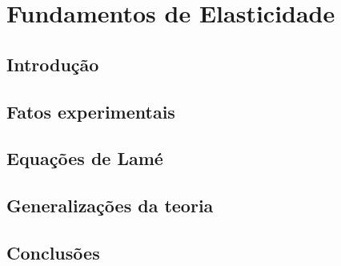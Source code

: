 \chapter{Fundamentos de Elasticidade}

\section{Introdução}

\section{Fatos experimentais}

\section{Equações de Lamé}

\section{Generalizações da teoria}

\section{Conclusões}